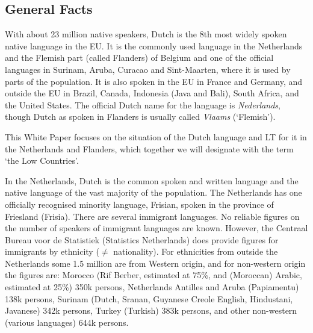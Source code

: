 \documentclass[]{../../metanetpaper}
\begin{document}

\begin{multicols}{2}

\subsection{General Facts}

    With about 23 million native speakers, Dutch is the 8th most widely spoken native language in the EU. It is the commonly used language in the Netherlands and the Flemish part (called Flanders) of Belgium and one of the official languages in Surinam, Aruba, Curacao and Sint-Maarten, where it is used by parts of the population. It is also spoken in the EU in France and Germany, and outside the EU in Brazil, Canada, Indonesia (Java and Bali), South Africa, and the United States.  The official Dutch name for the language is \textit{Nederlands}, though Dutch as spoken in Flanders is usually called \textit{Vlaams} (`Flemish').

    This White Paper focuses on the situation of the Dutch language and LT for it in the Netherlands and Flanders, which together we will designate with the term `the Low Countries'.

    In the Netherlands, Dutch is the common spoken and written language and the native language of the vast majority of the population. The Netherlands has one officially recognised minority language, Frisian, spoken in the province of Friesland (Frisia). There are several immigrant languages. No reliable figures on the number of speakers of immigrant languages are known. However, the Centraal Bureau voor de Statistiek (Statistics Netherlands) \cite{CBS}  does provide figures for immigrants by ethnicity ($\neq$ nationality). For ethnicities from outside the Netherlands some 1.5 million are from Western origin, and for non-western origin the figures are: Morocco (Rif Berber, estimated at 75\%, and (Moroccan) Arabic, estimated at 25\%) 350k persons, Netherlands Antilles and Aruba (Papiamentu) 138k persons, Surinam (Dutch, Sranan, Guyanese Creole English, Hindustani, Javanese) 342k persons, Turkey (Turkish) 383k persons, and other non-western (various languages) 644k persons.



\end{multicols}
\end{document}
